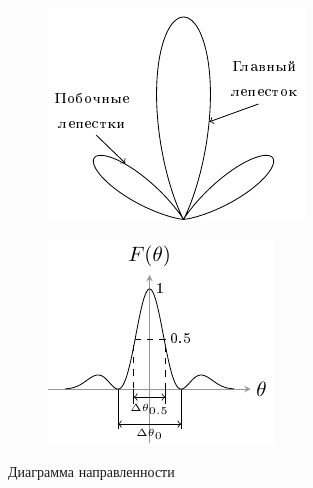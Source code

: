 \begin{center}
    \begin{figure}[h!]
        \begin{subfigure}[b]{.49\linewidth}
            \centering
            \includegraphics[width=\linewidth]{imgs/diag.pdf}
            \caption{}
            \label{fig:1:a}
        \end{subfigure}
        \begin{subfigure}[b]{.49\linewidth}
            \centering
            \includegraphics[width=\linewidth]{imgs/diag2.pdf}
            \caption{}
            \label{fig:1:b}
        \end{subfigure}
        \caption{Диаграмма направленности}
        \label{fig:1}
    \end{figure}
\end{center}


